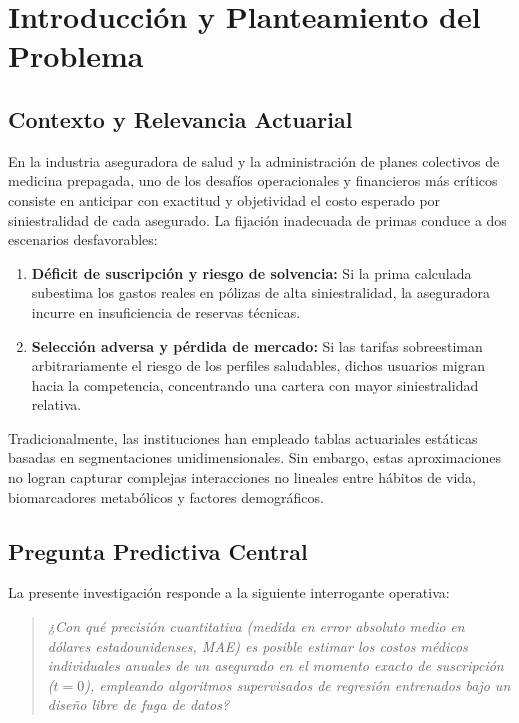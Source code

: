 \documentclass[11pt,a4paper]{article}
\begin{document}
\newpage
\tableofcontents
\newpage

\section{Introducción y Planteamiento del Problema}

\subsection{Contexto y Relevancia Actuarial}
En la industria aseguradora de salud y la administración de planes colectivos de medicina prepagada, uno de los desafíos operacionales y financieros más críticos consiste en anticipar con exactitud y objetividad el costo esperado por siniestralidad de cada asegurado. La fijación inadecuada de primas conduce a dos escenarios desfavorables:
\begin{enumerate}[leftmargin=*]
    \item \textbf{Déficit de suscripción y riesgo de solvencia:} Si la prima calculada subestima los gastos reales en pólizas de alta siniestralidad, la aseguradora incurre en insuficiencia de reservas técnicas.
    \item \textbf{Selección adversa y pérdida de mercado:} Si las tarifas sobreestiman arbitrariamente el riesgo de los perfiles saludables, dichos usuarios migran hacia la competencia, concentrando una cartera con mayor siniestralidad relativa.
\end{enumerate}
Tradicionalmente, las instituciones han empleado tablas actuariales estáticas basadas en segmentaciones unidimensionales. Sin embargo, estas aproximaciones no logran capturar complejas interacciones no lineales entre hábitos de vida, biomarcadores metabólicos y factores demográficos.

\subsection{Pregunta Predictiva Central}
La presente investigación responde a la siguiente interrogante operativa:
\begin{quote}
    \textit{¿Con qué precisión cuantitativa (medida en error absoluto medio en dólares estadounidenses, MAE) es posible estimar los costos médicos individuales anuales de un asegurado en el momento exacto de suscripción ($t = 0$), empleando algoritmos supervisados de regresión entrenados bajo un diseño libre de fuga de datos?}
\end{quote}
\end{document}
